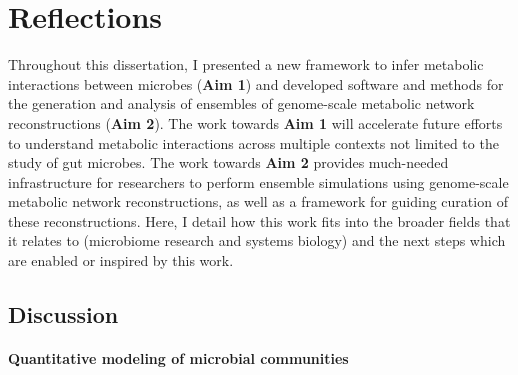 \documentclass[11pt,twocolumn,notitlepage,openany,twoside]{book}
\begin{document}
\chapter{Reflections}
\begin{refsection}

Throughout this dissertation, I presented a new framework to infer metabolic interactions between microbes (\textbf{Aim 1}) and developed software and methods for the generation and analysis of ensembles of genome-scale metabolic network reconstructions (\textbf{Aim 2}). The work towards \textbf{Aim 1} will accelerate future efforts to understand metabolic interactions across multiple contexts not limited to the study of gut microbes. The work towards \textbf{Aim 2} provides much-needed infrastructure for researchers to perform ensemble simulations using genome-scale metabolic network reconstructions, as well as a framework for guiding curation of these reconstructions. Here, I detail how this work fits into the broader fields that it relates to (microbiome research and systems biology) and the next steps which are enabled or inspired by this work.

\section{Discussion}
\subsubsection{Quantitative modeling of microbial communities}


\end{refsection}
\end{document}
